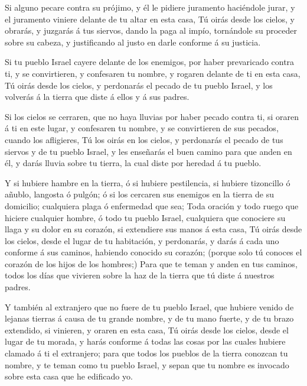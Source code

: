  Si alguno pecare contra su prójimo, y él le pidiere
juramento haciéndole jurar, y el juramento viniere delante de tu altar
en esta casa,  Tú oirás desde los cielos, y obrarás, y
juzgarás á tus siervos, dando la paga al impío, tornándole su proceder
sobre su cabeza, y justificando al justo en darle conforme á su
justicia.

 Si tu pueblo Israel cayere delante de los enemigos, por
haber prevaricado contra ti, y se convirtieren, y confesaren tu nombre,
y rogaren delante de ti en esta casa,  Tú oirás desde los
cielos, y perdonarás el pecado de tu pueblo Israel, y los volverás á la
tierra que diste á ellos y á sus padres.

 Si los cielos se cerraren, que no haya lluvias por haber
pecado contra ti, si oraren á ti en este lugar, y confesaren tu nombre,
y se convirtieren de sus pecados, cuando los afligieres, 
Tú los oirás en los cielos, y perdonarás el pecado de tus siervos y de
tu pueblo Israel, y les enseñarás el buen camino para que anden en él, y
darás lluvia sobre tu tierra, la cual diste por heredad á tu pueblo.

 Y si hubiere hambre en la tierra, ó si hubiere
pestilencia, si hubiere tizoncillo ó añublo, langosta ó pulgón; ó si los
cercaren sus enemigos en la tierra de su domicilio; cualquiera plaga ó
enfermedad que sea;  Toda oración y todo ruego que hiciere
cualquier hombre, ó todo tu pueblo Israel, cualquiera que conociere su
llaga y su dolor en su corazón, si extendiere sus manos á esta casa,
 Tú oirás desde los cielos, desde el lugar de tu
habitación, y perdonarás, y darás á cada uno conforme á sus caminos,
habiendo conocido su corazón; (porque solo tú conoces el corazón de los
hijos de los hombres;)  Para que te teman y anden en tus
caminos, todos los días que vivieren sobre la haz de la tierra que tú
diste á nuestros padres.

 Y también al extranjero que no fuere de tu pueblo Israel,
que hubiere venido de lejanas tierras á causa de tu grande nombre, y de
tu mano fuerte, y de tu brazo extendido, si vinieren, y oraren en esta
casa,  Tú oirás desde los cielos, desde el lugar de tu
morada, y harás conforme á todas las cosas por las cuales hubiere
clamado á ti el extranjero; para que todos los pueblos de la tierra
conozcan tu nombre, y te teman como tu pueblo Israel, y sepan que tu
nombre es invocado sobre esta casa que he edificado yo.

